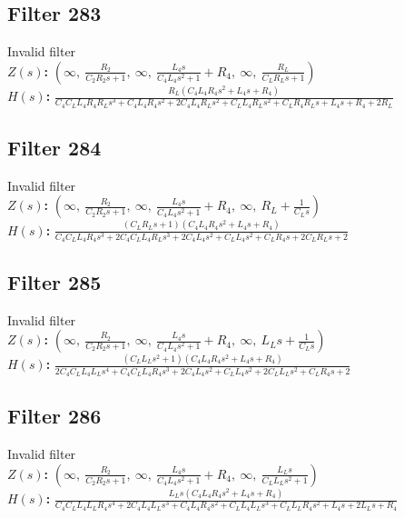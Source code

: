 \documentclass{article}
\begin{document}
\subsection*{Filter 283}
Invalid filter \\ 
\textbf{$Z(s)$:} $\left( \infty, \  \frac{R_{2}}{C_{2} R_{2} s + 1}, \  \infty, \  \frac{L_{4} s}{C_{4} L_{4} s^{2} + 1} + R_{4}, \  \infty, \  \frac{R_{L}}{C_{L} R_{L} s + 1}\right)$ \\ 
\textbf{$H(s)$:} $\frac{R_{L} \left(C_{4} L_{4} R_{4} s^{2} + L_{4} s + R_{4}\right)}{C_{4} C_{L} L_{4} R_{4} R_{L} s^{3} + C_{4} L_{4} R_{4} s^{2} + 2 C_{4} L_{4} R_{L} s^{2} + C_{L} L_{4} R_{L} s^{2} + C_{L} R_{4} R_{L} s + L_{4} s + R_{4} + 2 R_{L}}$ \\ 
\subsection*{Filter 284}
Invalid filter \\ 
\textbf{$Z(s)$:} $\left( \infty, \  \frac{R_{2}}{C_{2} R_{2} s + 1}, \  \infty, \  \frac{L_{4} s}{C_{4} L_{4} s^{2} + 1} + R_{4}, \  \infty, \  R_{L} + \frac{1}{C_{L} s}\right)$ \\ 
\textbf{$H(s)$:} $\frac{\left(C_{L} R_{L} s + 1\right) \left(C_{4} L_{4} R_{4} s^{2} + L_{4} s + R_{4}\right)}{C_{4} C_{L} L_{4} R_{4} s^{3} + 2 C_{4} C_{L} L_{4} R_{L} s^{3} + 2 C_{4} L_{4} s^{2} + C_{L} L_{4} s^{2} + C_{L} R_{4} s + 2 C_{L} R_{L} s + 2}$ \\ 
\subsection*{Filter 285}
Invalid filter \\ 
\textbf{$Z(s)$:} $\left( \infty, \  \frac{R_{2}}{C_{2} R_{2} s + 1}, \  \infty, \  \frac{L_{4} s}{C_{4} L_{4} s^{2} + 1} + R_{4}, \  \infty, \  L_{L} s + \frac{1}{C_{L} s}\right)$ \\ 
\textbf{$H(s)$:} $\frac{\left(C_{L} L_{L} s^{2} + 1\right) \left(C_{4} L_{4} R_{4} s^{2} + L_{4} s + R_{4}\right)}{2 C_{4} C_{L} L_{4} L_{L} s^{4} + C_{4} C_{L} L_{4} R_{4} s^{3} + 2 C_{4} L_{4} s^{2} + C_{L} L_{4} s^{2} + 2 C_{L} L_{L} s^{2} + C_{L} R_{4} s + 2}$ \\ 
\subsection*{Filter 286}
Invalid filter \\ 
\textbf{$Z(s)$:} $\left( \infty, \  \frac{R_{2}}{C_{2} R_{2} s + 1}, \  \infty, \  \frac{L_{4} s}{C_{4} L_{4} s^{2} + 1} + R_{4}, \  \infty, \  \frac{L_{L} s}{C_{L} L_{L} s^{2} + 1}\right)$ \\ 
\textbf{$H(s)$:} $\frac{L_{L} s \left(C_{4} L_{4} R_{4} s^{2} + L_{4} s + R_{4}\right)}{C_{4} C_{L} L_{4} L_{L} R_{4} s^{4} + 2 C_{4} L_{4} L_{L} s^{3} + C_{4} L_{4} R_{4} s^{2} + C_{L} L_{4} L_{L} s^{3} + C_{L} L_{L} R_{4} s^{2} + L_{4} s + 2 L_{L} s + R_{4}}$ \\ 
\end{document}
